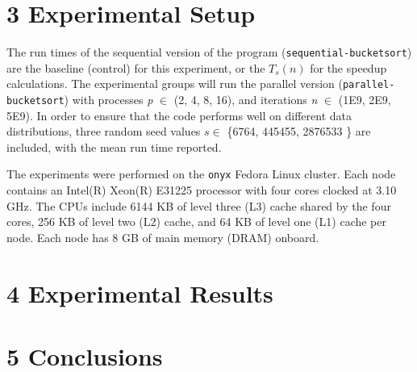 \documentclass{bsu-ms}
\begin{document}
\section*{3 Experimental Setup}

The run times of the sequential version of the program (\texttt{sequential-bucketsort}) are the baseline (control) for this experiment, or the $T_s(n)$ for the speedup calculations. The experimental groups will run the parallel version (\texttt{parallel-bucketsort}) with processes \textit{p} $\in$ (2, 4, 8, 16), and iterations \textit{n} $\in$ (1E9, 2E9, 5E9). In order to ensure that the code performs well on different data distributions, three random seed values $s \in$ \{6764, 445455, 2876533 \} are included, with the mean run time reported.

The experiments were performed on the \texttt{onyx} Fedora Linux cluster. Each node  contains an Intel(R) Xeon(R) E31225 processor with four cores clocked at 3.10 GHz. The CPUs include 6144 KB of level three (L3) cache shared by the four cores, 256 KB of level two (L2) cache, and 64 KB of level one (L1) cache per node. Each node has 8 GB of main memory (DRAM) onboard.

\section*{4 Experimental Results}


\section*{5 Conclusions}
\end{document}
